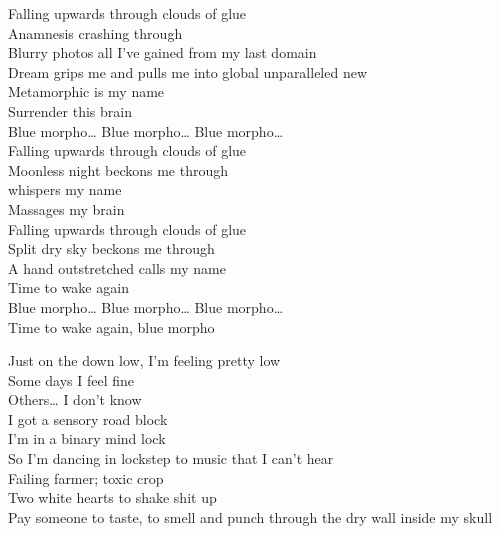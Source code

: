 


Falling upwards through clouds of glue \\
Anamnesis crashing through \\
Blurry photos all I've gained from my last domain \\

Dream grips me and pulls me into global unparalleled new \\
Metamorphic is my name \\
Surrender this brain \\

Blue morpho… Blue morpho… Blue morpho… \\

Falling upwards through clouds of glue \\
Moonless night beckons me through \\
 whispers my name \\
Massages my brain \\

Falling upwards through clouds of glue \\
Split dry sky beckons me through \\
A hand outstretched calls my name \\
Time to wake again \\

Blue morpho… Blue morpho… Blue morpho… \\

Time to wake again, blue morpho \\




Just on the down low, I'm feeling pretty low \\
Some days I feel fine \\
Others… I don't know \\
I got a sensory road block \\
I'm in a binary mind lock \\
So I'm dancing in lockstep to music that I can't hear \\

Failing farmer; toxic crop \\
Two white hearts to shake shit up \\
Pay someone to taste, to smell and punch through the dry wall inside my skull \\

